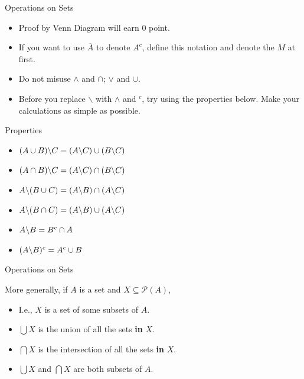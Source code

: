 \begin{frame}{Operations on Sets}
    \begin{itemize}
        \item Proof by Venn Diagram will earn 0 point.
        \item If you want to use $\overline{A}$ to denote $A^c$, define this notation and denote the $M$ at first.
        \item Do not misuse $\wedge$ and $\cap$; $\vee$ and $\cup$.
        \item Before you replace $\backslash$ with $\wedge$ and $^c$, try using the properties below. Make your calculations as simple as possible.
    \end{itemize}
    \begin{block}{Properties}
    \begin{itemize}
        \item $(A\cup B)\backslash C=(A\backslash C)\cup(B\backslash C)$
        \item $(A\cap B)\backslash C=(A\backslash C)\cap(B\backslash C)$
        \item $A\backslash (B\cup C)=(A\backslash B)\cap(A\backslash C)$
        \item $A\backslash (B\cap C)=(A\backslash B)\cup(A\backslash C)$
        \item $A\backslash B=B^c\cap A$
        \item $(A\backslash B)^c=A^c\cup B$
    \end{itemize}
    \end{block}
\end{frame}

\begin{frame}{Operations on Sets}
    \begin{definition}
        More generally, if $A$ is a set and $X\subseteq \mathscr{P}(A)$,
    \end{definition}
    \begin{itemize}
        \item I.e., $X$ is a set of some subsets of $A$. 
        \item $\bigcup X$ is the union of all the sets \textbf{in} $X$.
        \item $\bigcap X$ is the intersection of all the sets \textbf{in} $X$.
        \item $\bigcup X$ and $\bigcap X$ are both subsets of $A$.
    \end{itemize}
\end{frame}

